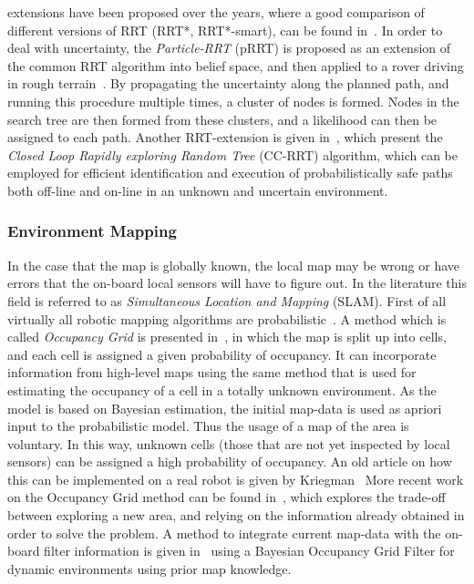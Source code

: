 extensions have been proposed over the years, where a good comparison of
different versions of RRT (RRT*, RRT*-smart), can be found
in~\cite{noreenComparisonRRTRRT2016}. In order to deal with uncertainty, the
\textit{Particle-RRT} (pRRT) is proposed as an extension of the common RRT
algorithm into belief space, and then applied to a rover driving in rough
terrain~\cite{melchiorParticleRRTPath2007}. By propagating the uncertainty along
the planned path, and running this procedure multiple times, a cluster of nodes
is formed. Nodes in the search tree are then formed from these clusters, and a
likelihood can then be assigned to each path. Another RRT-extension is given
in~\cite{Luders_2013}, which present the \textit{Closed Loop Rapidly exploring
  Random Tree} (CC-RRT) algorithm, which can be employed for efficient
identification and execution of probabilistically safe paths both off-line and
on-line in an unknown and uncertain environment.

\subsubsection{Environment Mapping}
In the case that the map is globally known, the local map may be wrong or have
errors that the on-board local sensors will have to figure out. In the
literature this field is referred to as \textit{Simultaneous Location and
  Mapping} (SLAM). First of all virtually all robotic mapping algorithms are
probabilistic~\cite{thrunRoboticMappingSurvey}. %
A method which is called \textit{Occupancy Grid} is presented
in~\cite{elfes1989using}, in which the map is split up into cells, and each cell
is assigned a given probability of occupancy. It can incorporate information
from high-level maps using the same method that is used for estimating the
occupancy of a cell in a totally unknown environment. As the model is based on
Bayesian estimation, the initial map-data is used as apriori input to the
probabilistic model. Thus the usage of a map of the area is voluntary. In this
way, unknown cells (those that are not yet inspected by local sensors) can be
assigned a high probability of occupancy. An old article on how this can be
implemented on a real robot is given by Kriegman~\cite{kriegman1987mobile} More
recent work on the Occupancy Grid method can be found in~\cite{7139224}, which
explores the trade-off between exploring a new area, and relying on the
information already obtained in order to solve the problem. A method to
integrate current map-data with the on-board filter information is given
in~\cite{gindeleBayesianOccupancyGrid2009} using a Bayesian Occupancy Grid
Filter for dynamic environments using prior map knowledge.

